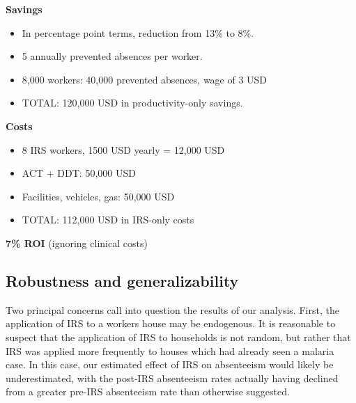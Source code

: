 \documentclass[]{article}
\providecommand{\tightlist}{%
  \setlength{\itemsep}{0pt}\setlength{\parskip}{0pt}}
\begin{document}

\textbf{Savings}

\begin{itemize}
\tightlist
\item
  In percentage point terms, reduction from 13\% to 8\%.\\
\item
  5 annually prevented absences per worker.\\
\item
  8,000 workers: 40,000 prevented absences, wage of 3 USD
\item
  TOTAL: 120,000 USD in productivity-only savings.
\end{itemize}

\textbf{Costs}

\begin{itemize}
\tightlist
\item
  8 IRS workers, 1500 USD yearly = 12,000 USD\\
\item
  ACT + DDT: 50,000 USD
\item
  Facilities, vehicles, gas: 50,000 USD\\
\item
  TOTAL: 112,000 USD in IRS-only costs
\end{itemize}

\textbf{7\% ROI} (ignoring clinical costs)

\newpage

\subsection{Robustness and
generalizability}\label{robustness-and-generalizability}

Two principal concerns call into question the results of our analysis.
First, the application of IRS to a workers house may be
endogenous.
It is reasonable to suspect that the application of IRS to households is
not random, but rather that IRS was applied more frequently to houses
which had already seen a malaria case. In this case, our estimated
effect of IRS on absenteeism would likely be underestimated, with the
post-IRS absenteeism rates actually having declined from a greater
pre-IRS absenteeism rate than otherwise suggested.
\end{document}

